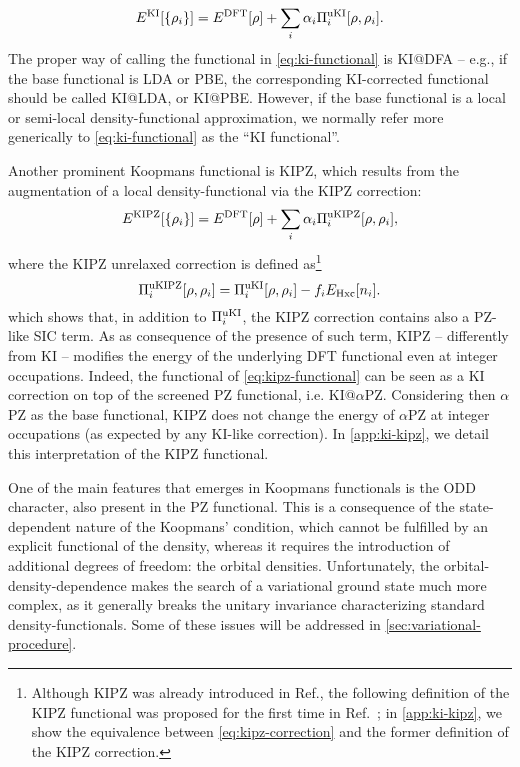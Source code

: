 %
\begin{equation}
    E^{\rm KI}[\{\rho_i\}] = E^{\rm DFT}[\rho] + \sum_i \alpha_i \Pi_i^{\rm uKI}[\rho, \rho_i] .
    \label{eq:ki-functional}
\end{equation}
%
The proper way of calling the functional in \cref{eq:ki-functional} is KI@DFA -- e.g., if the base functional is LDA or PBE, the corresponding KI-corrected functional should be called KI@LDA, or KI@PBE. However, if the base functional is a local or semi-local density-functional approximation, we normally refer more generically to \cref{eq:ki-functional} as the ``KI functional''.

Another prominent Koopmans functional is KIPZ, which results from the augmentation of a local density-functional via the KIPZ correction:
%
\begin{equation}
    E^{\rm KIPZ}[\{\rho_i\}] = E^{\rm DFT}[\rho] + \sum_i \alpha_i \Pi_i^{\rm uKIPZ}[\rho, \rho_i] ,
    \label{eq:kipz-functional}
\end{equation}
%
where the KIPZ unrelaxed correction is defined as\footnote{Although KIPZ was already introduced in Ref.\cite{borghi_koopmans-compliant_2014}, the following definition of the KIPZ functional was proposed for the first time in Ref.~\cite{borghi_variational_2015}; in \cref{app:ki-kipz}, we show the equivalence between \cref{eq:kipz-correction} and the former definition of the KIPZ correction.}
%
\begin{equation}
    \Pi_i^{\rm uKIPZ}[\rho,\rho_i] = \Pi_i^{\rm uKI}[\rho,\rho_i] - f_i E_{\rm Hxc}[n_i] .
    \label{eq:kipz-correction}
\end{equation}
%
which shows that, in addition to $\Pi_i^{\rm uKI}$, the KIPZ correction contains also a PZ-like SIC term. As as consequence of the presence of such term, KIPZ -- differently from KI -- modifies the energy of the underlying DFT functional even at integer occupations. Indeed, the functional of \cref{eq:kipz-functional} can be seen as a KI correction on top of the screened PZ functional, i.e. KI@$\alpha$PZ. Considering then $\alpha$PZ as the base functional, KIPZ does not change the energy of $\alpha$PZ at integer occupations (as expected by any KI-like correction). In \cref{app:ki-kipz}, we detail this interpretation of the KIPZ functional.

One of the main features that emerges in Koopmans functionals is the ODD character, also present in the PZ functional. This is a consequence of the state-dependent nature of the Koopmans' condition, which cannot be fulfilled by an explicit functional of the density, whereas it requires the introduction of additional degrees of freedom: the orbital densities. Unfortunately, the orbital-density-dependence makes the search of a variational ground state much more complex, as it generally breaks the unitary invariance characterizing standard density-functionals. Some of these issues will be addressed in \cref{sec:variational-procedure}.

